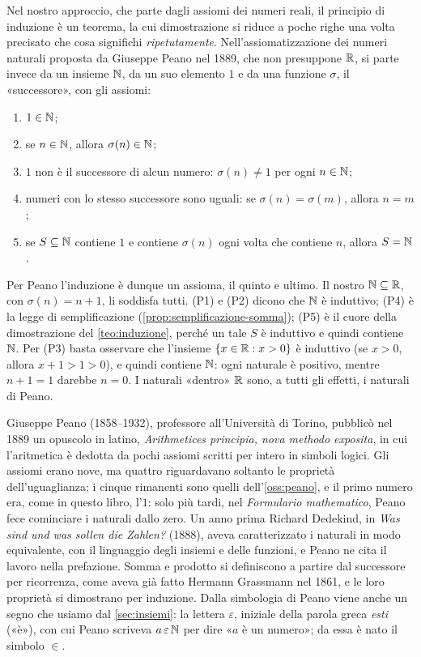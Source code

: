 \begin{osservazione}\label{oss:peano}
Nel nostro approccio, che parte dagli assiomi dei numeri reali, il principio di
induzione è un teorema, la cui dimostrazione si riduce a poche righe una volta precisato
che cosa significhi \emph{ripetutamente}. Nell'assiomatizzazione dei numeri naturali
proposta da Giuseppe Peano nel 1889, che non presuppone $\mathbb{R}$, si parte invece da un
insieme $\mathbb{N}$, da un suo elemento $1$ e da una funzione $\sigma$, il «successore», con
gli assiomi:
\begin{enumerate}[label=\textup{(P\arabic*)}, leftmargin=3em]
  \item $1\in\mathbb{N}$;
  \item se $n\in\mathbb{N}$, allora $\sigma(n)\in\mathbb{N}$;
  \item $1$ non è il successore di alcun numero: $\sigma(n)\neq1$ per ogni $n\in\mathbb{N}$;
  \item numeri con lo stesso successore sono uguali: se $\sigma(n)=\sigma(m)$, allora
  $n=m$;
  \item se $S\subseteq\mathbb{N}$ contiene $1$ e contiene $\sigma(n)$ ogni volta che contiene
  $n$, allora $S=\mathbb{N}$.
\end{enumerate}
Per Peano l'induzione è dunque un assioma, il quinto e ultimo. Il nostro $\mathbb{N}\subseteq\mathbb{R}$,
con $\sigma(n)=n+1$, li soddisfa tutti. (P1) e (P2) dicono che $\mathbb{N}$ è induttivo; (P4) è
la legge di semplificazione (\cref{prop:semplificazione-somma}); (P5) è il cuore della
dimostrazione del \cref{teo:induzione}, perché un tale $S$ è induttivo e quindi contiene
$\mathbb{N}$. Per (P3) basta osservare che l'insieme $\{x\in\mathbb{R} : x>0\}$ è induttivo (se $x>0$,
allora $x+1>1>0$), e quindi contiene $\mathbb{N}$: ogni naturale è positivo, mentre $n+1=1$
darebbe $n=0$. I naturali «dentro» $\mathbb{R}$ sono, a tutti gli effetti, i naturali di Peano.
\end{osservazione}

\begin{notastorica}
Giuseppe Peano (1858--1932), professore all'Università di Torino, pubblicò nel 1889 un
opuscolo in latino, \emph{Arithmetices principia, nova methodo exposita}, in cui
l'aritmetica è dedotta da pochi assiomi scritti per intero in simboli logici. Gli
assiomi erano nove, ma quattro riguardavano soltanto le proprietà dell'uguaglianza; i
cinque rimanenti sono quelli dell'\cref{oss:peano}, e il primo numero era, come in questo
libro, l'$1$: solo più tardi, nel \emph{Formulario mathematico}, Peano fece cominciare i
naturali dallo zero. Un anno prima Richard Dedekind, in \emph{Was sind und was sollen die
Zahlen?} (1888), aveva caratterizzato i naturali in modo equivalente, con il linguaggio
degli insiemi e delle funzioni, e Peano ne cita il lavoro nella prefazione. Somma e
prodotto si definiscono a partire dal successore per ricorrenza, come aveva già fatto
Hermann Grassmann nel 1861, e le loro proprietà si dimostrano per induzione. Dalla
simbologia di Peano viene anche un segno che usiamo dal \cref{sec:insiemi}: la lettera
$\varepsilon$, iniziale della parola greca \emph{esti} («è»), con cui Peano scriveva
$a\,\varepsilon\,\mathbb{N}$ per dire «$a$ è un numero»; da essa è nato il simbolo $\in$.
\end{notastorica}


